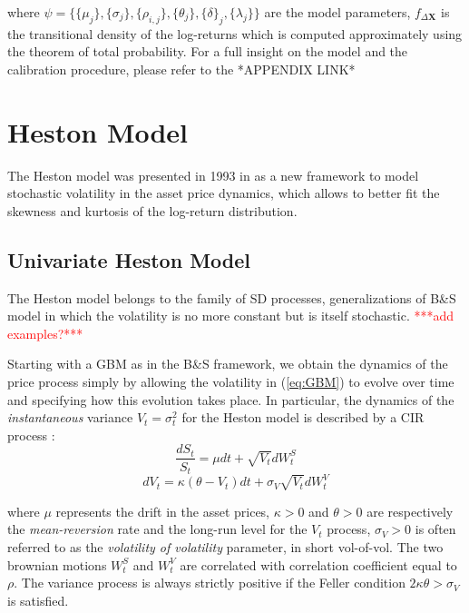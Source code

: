 where $\psi = \{ \{\mu_j\},\{\sigma_j\},\{\rho_{i,j}\},\{\theta_j\},\{\delta\}_j,\{\lambda_j\} \}$ are the model parameters, $f_{\Delta \mathbf{X}}$ is the transitional density of the log-returns which is computed approximately using the theorem of total probability.
For a full insight on the model and the calibration procedure, please refer to the *APPENDIX LINK*

\bigskip

\section{Heston Model}

The Heston model was presented in 1993 in \cite{HESTON93} as a new framework to model stochastic volatility in the asset price dynamics, which allows to better fit the skewness and kurtosis of the log-return distribution.

\subsection{Univariate Heston Model}
The Heston model belongs to the family of SD processes, generalizations of B\&S model in which the volatility is no more constant but is itself  stochastic.
\textcolor{red}{***add examples?***}

Starting with a GBM as in the B\&S framework, we obtain the dynamics of the price process simply by allowing the volatility in (\ref{eq:GBM}) to evolve over time and specifying how this evolution takes place.
In particular, the dynamics of the \textit{instantaneous} variance $V_t = \sigma_t^2$ for the Heston model is described by a CIR process :
\begin{equation}
	\frac{dS_t}{S_t} = \mu dt +\sqrt{ V_t} dW_t^S
\end{equation}
\begin{equation}
	dV_t = \kappa (\theta - V_t) dt + \sigma_V \sqrt{V_t} dW_t^V
\end{equation}

where $\mu$ represents the drift in the asset prices, $\kappa>0$ and $\theta>0$ are respectively the \textit{mean-reversion} rate  and the long-run level for the $V_t$ process, $\sigma_V>0$ is often referred to as the \textit{volatility of volatility} parameter, in short vol-of-vol.
The two brownian motions $W_t^S$ and $W_t^V$ are correlated with correlation coefficient equal to $\rho$.
The variance process is always strictly positive if the Feller condition $2\kappa\theta > \sigma_V$ is satisfied.


